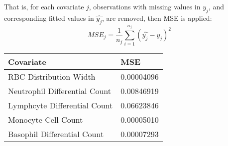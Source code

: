\documentclass[landscape,a0paper,fontscale=0.285]{baposter} %
\begin{document}
\begin{poster}
{That is, for each covariate $j$, observations with missing values in $y_{j}$,
and corresponding fitted values in $\hat{y_{j}}$, are removed, then MSE is
applied:
$$ MSE_{j} = \frac{1}{n_{j}} \sum_{i = 1}^{n_{j}} (\hat{y_{j}} - y_{j})^{2} $$

\begin{center}
\begin{tabular}{l l}
\toprule
\textbf{Covariate} & \textbf{MSE}\\
\midrule
RBC Distribution Width & 0.00004096 \\
Neutrophil Differential Count & 0.00846919 \\
Lymphcyte Differential Count & 0.06623846 \\
Monocyte Cell Count & 0.00005010 \\
Basophil Differential Count & 0.00007293 \\
\bottomrule
\end{tabular}
\end{center}
}


\end{poster}
\end{document}
